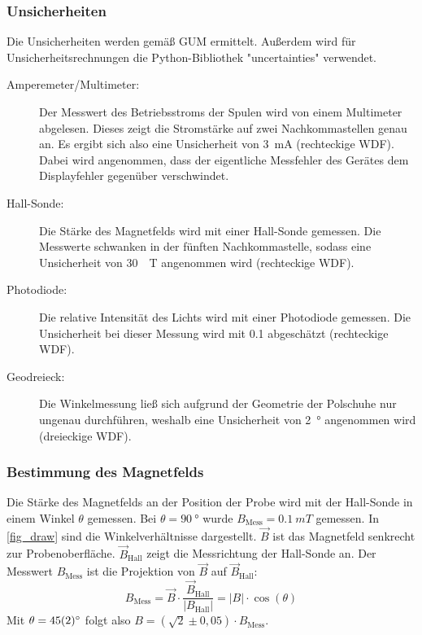 \documentclass[
	a4paper,
	12pt,
	pagesize,
	ngerman
]{scrartcl}
\begin{document}
	\subsubsection{Unsicherheiten}
	Die Unsicherheiten werden gemäß GUM ermittelt. 
	Außerdem wird für Unsicherheitsrechnungen die Python-Bibliothek "uncertainties" verwendet.
	\begin{description}
		\item[Amperemeter/Multimeter:] Der Messwert des Betriebsstroms der Spulen wird von einem Multimeter abgelesen. 
			Dieses zeigt die Stromstärke auf zwei Nachkommastellen genau an. 
			Es ergibt sich also eine Unsicherheit von \SI{3}{mA} (rechteckige WDF).
			Dabei wird angenommen, dass der eigentliche Messfehler des Gerätes dem Displayfehler gegenüber verschwindet. 
		\item[Hall-Sonde:]  Die Stärke des Magnetfelds wird mit einer Hall-Sonde gemessen. Die Messwerte schwanken in der fünften Nachkommastelle, sodass eine Unsicherheit von \SI{30}{\mu T} angenommen wird (rechteckige WDF).
		\item[Photodiode:]  Die relative Intensität des Lichts wird mit einer Photodiode gemessen. Die Unsicherheit bei dieser Messung wird mit \SI{0,1}{} abgeschätzt (rechteckige WDF).
		\item[Geodreieck:]  Die Winkelmessung ließ sich aufgrund der Geometrie der Polschuhe nur ungenau durchführen, weshalb eine Unsicherheit von \SI{2}{\degree} angenommen wird (dreieckige WDF).
	\end{description} 

	\subsubsection{Bestimmung des Magnetfelds}
	\label{ss_spule}
	Die Stärke des Magnetfelds an der Position der Probe wird mit der Hall-Sonde in einem Winkel $\theta$ gemessen.
	Bei $\theta=\SI{90}{\degree}$ wurde $B_\text{Mess} = \SI{0,1}{mT}$ gemessen.
	In \cref{fig_draw} sind die Winkelverhältnisse dargestellt. 
	$\vec B$ ist das Magnetfeld senkrecht zur Probenoberfläche. 
	$\vec B_\text{Hall}$ zeigt die Messrichtung der Hall-Sonde an.
	Der Messwert $ B_\text{Mess}$ ist die Projektion von $\vec B$ auf $\vec B_\text{Hall}$:
	\begin{equation}
		B_\text{Mess}  = \vec B \cdot \frac{\vec B_\text{Hall}}{\left| B_\text{Hall} \right|} = \left| B \right| \cdot \cos(\theta)
	\end{equation}
	Mit $\theta=\SI{45\pm 2}{\degree}$ folgt also $B = (\sqrt{2}\pm0,05) \cdot B_\text{Mess}$.
\end{document}
